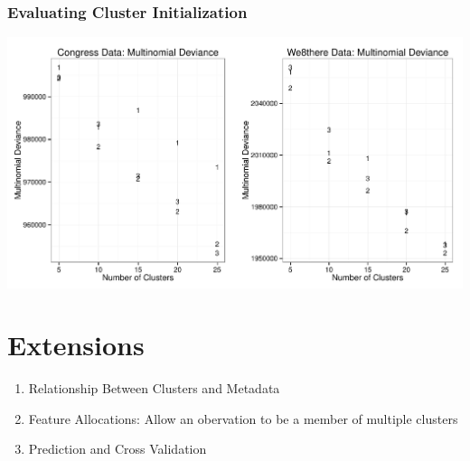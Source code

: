 \documentclass{beamer}
\begin{document}
\begin{frame}
\frametitle{Evaluating Cluster Initialization}
\begin{center}
\includegraphics[width=1.05\textwidth]{Images/mdev_both.pdf}
\end{center}
\end{frame}

\section{Extensions}
\begin{frame}
\begin{enumerate}
\item Relationship Between Clusters and Metadata
\item Feature Allocations: Allow an obervation to be a member of multiple clusters
\item Prediction and Cross Validation
\end{enumerate}
\end{frame}
\end{document}
